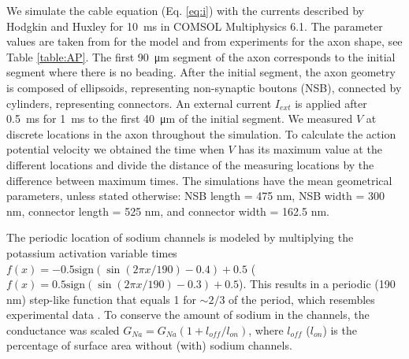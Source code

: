 \documentclass[11pt]{article}
\begin{document}
We simulate the cable equation (Eq. \eqref{eq:i}) with the currents described by Hodgkin and Huxley for \SI{10}{\milli\second} in COMSOL Multiphysics 6.1. The parameter values are taken from \cite{koch2004biophysics} for the model and from experiments for the axon shape, see Table \ref{table:AP}. The first \SI{90}{\micro\meter} segment of the axon corresponds to the initial segment where there is no beading. After the initial segment, the axon geometry is composed of ellipsoids, representing non-synaptic boutons (NSB), connected by cylinders, representing connectors. An external current $I_{ext}$ is applied after \SI{0.5}{\milli\second} for \SI{1}{\milli\second} to the first \SI{40}{\micro\meter} of the initial segment. We measured $V$ at discrete locations in the axon throughout the simulation. To calculate the action potential velocity we obtained the time when $V$ has its maximum value at the different locations and divide the distance of the measuring locations by the difference between maximum times. 
The simulations have the mean geometrical parameters, unless stated otherwise: NSB length = 475 nm, NSB width = 300 nm, connector length = 525 nm, and connector width = 162.5 nm. 

The periodic location of sodium channels is modeled by multiplying the potassium activation variable times $f(x) = -0.5 \mathrm{sign} ( \sin (2\pi x/190)-0.4)+0.5 $ ($f(x) = 0.5 \mathrm{sign} ( \sin (2\pi x/190)-0.3)+0.5 $). This results in a periodic (190 nm) step-like function that equals 1 for $\sim 2/3$ of the period, which resembles experimental data \cite{xu2013actin}. To conserve the amount of sodium in the channels, the conductance was scaled $G_{Na} = G_{Na} ( 1 + l_{off}/l_{on})$, where $l_{off}$ ($l_{on}$) is the percentage of surface area without (with) sodium channels.
\end{document}
